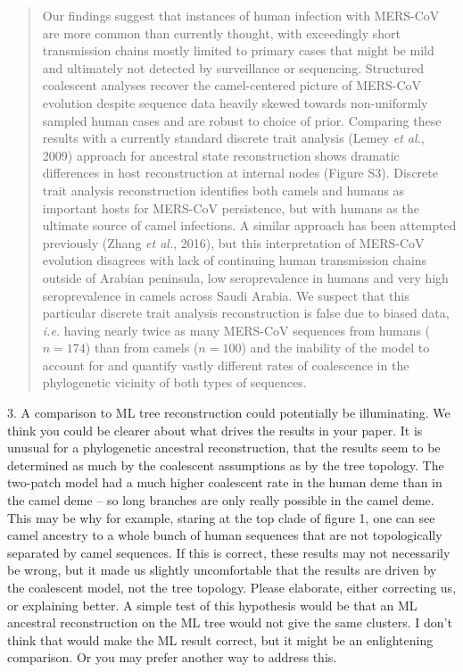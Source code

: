 \documentclass[11pt,oneside,letterpaper]{article}
\begin{document}
\begin{quotation}
Our findings suggest that instances of human infection with MERS-CoV are more common than currently thought, with exceedingly short transmission chains mostly limited to primary cases that might be mild and ultimately not detected by surveillance or sequencing.
Structured coalescent analyses recover the camel-centered picture of MERS-CoV evolution despite sequence data heavily skewed towards non-uniformly sampled human cases and are robust to choice of prior.
Comparing these results with a currently standard discrete trait analysis (Lemey \textit{et al.}, 2009) approach for ancestral state reconstruction shows dramatic differences in host reconstruction at internal nodes (Figure S3).
Discrete trait analysis reconstruction identifies both camels and humans as important hosts for MERS-CoV persistence, but with humans as the ultimate source of camel infections.
A similar approach has been attempted previously (Zhang \textit{et al.}, 2016), but this interpretation of MERS-CoV evolution disagrees with lack of continuing human transmission chains outside of Arabian peninsula, low seroprevalence in humans and very high seroprevalence in camels across Saudi Arabia.
We suspect that this particular discrete trait analysis reconstruction is false due to biased data, \textit{i.e.} having nearly twice as many MERS-CoV sequences from humans ($n=174$) than from camels ($n=100$) and the inability of the model to account for and quantify vastly different rates of coalescence in the phylogenetic vicinity of both types of sequences.
\end{quotation}

3. A comparison to ML tree reconstruction could potentially be illuminating. We think you could be clearer about what drives the results in your paper. It is unusual for a phylogenetic ancestral reconstruction, that the results seem to be determined as much by the coalescent assumptions as by the tree topology. The two-patch model had a much higher coalescent rate in the human deme than in the camel deme -- so long branches are only really possible in the camel deme. This may be why for example, staring at the top clade of figure 1, one can see camel ancestry to a whole bunch of human sequences that are not topologically separated by camel sequences. If this is correct, these results may not necessarily be wrong, but it made us slightly uncomfortable that the results are driven by the coalescent model, not the tree topology. Please elaborate, either correcting us, or explaining better. A simple test of this hypothesis would be that an ML ancestral reconstruction on the ML tree would not give the same clusters. I don't think that would make the ML result correct, but it might be an enlightening comparison. Or you may prefer another way to address this.
\end{document}
